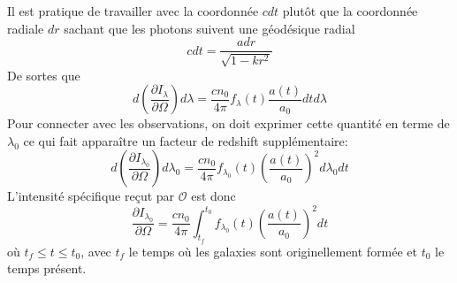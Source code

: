 \documentclass{article}
\numberwithin{equation}{section}
\begin{document}
Il est pratique de travailler avec la coordonnée $cdt$ plutôt que la coordonnée radiale $dr$ 
sachant que les photons suivent une géodésique radial
\[
        cdt = \frac{adr}{\sqrt{1 - kr^2}}
\]
De sortes que 
\[
        d(\frac{\partial I_\lambda}{\partial \Omega}) 
        d\lambda= \frac{cn_0 }{4 \pi}f_\lambda(t) \frac{a(t)}{a_0} dtd\lambda 
\]
Pour connecter avec les observations, on doit exprimer cette quantité en terme de $\lambda_0$ 
ce qui fait apparaître un facteur de redshift supplémentaire:
\begin{equation}\label{eq:intensity} 
        d(\frac{\partial I_{\lambda_0}}{\partial \Omega}) d\lambda_0 = 
        \frac{c n_0}{4 \pi} f_{\lambda_0}(t) 
        \left( \frac{a(t)}{a_0} \right)^{2}d\lambda_0 dt
\end{equation} 
L'intensité spécifique reçut par $\mathcal{O}$ est donc 
\begin{equation}\label{eq:Ispec} 
        \frac{\partial I_{\lambda_0}}{\partial \Omega} = 
        \frac{cn_0}{4 \pi}
        \int_{t_f}^{t_0} f_{\lambda_0}(t) \left( \frac{a(t)}{a_0} \right)^{2} dt
\end{equation} 
où $t_f \leq t \leq t_0$, avec $t_f$ le temps où les galaxies sont originellement formée et 
$t_0$ le temps présent.
\end{document}
